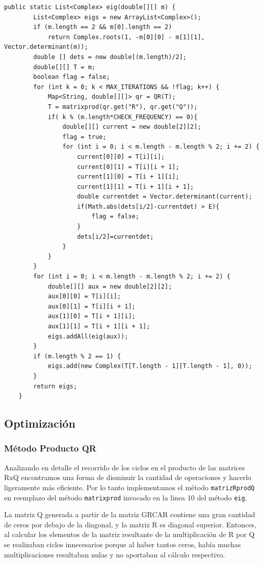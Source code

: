\documentclass[a4paper,10pt,spanish]{article}
\begin{document}
\begin{lstlisting}[caption = Implementación del algoritmo QR en Java]
public static List<Complex> eig(double[][] m) {
		List<Complex> eigs = new ArrayList<Complex>();
		if (m.length == 2 && m[0].length == 2)
			return Complex.roots(1, -m[0][0] - m[1][1], Vector.determinant(m));
		double [] dets = new double[(m.length)/2];
		double[][] T = m;
		boolean flag = false;
		for (int k = 0; k < MAX_ITERATIONS && !flag; k++) {
			Map<String, double[][]> qr = QR(T);
			T = matrixprod(qr.get("R"), qr.get("Q"));
			if( k % (m.length*CHECK_FREQUENCY) == 0){
				double[][] current = new double[2][2];
				flag = true;
				for (int i = 0; i < m.length - m.length % 2; i += 2) {
					current[0][0] = T[i][i];
					current[0][1] = T[i][i + 1];
					current[1][0] = T[i + 1][i];
					current[1][1] = T[i + 1][i + 1];
					double currentdet = Vector.determinant(current);
					if(Math.abs(dets[i/2]-currentdet) > E){
						flag = false;
					}
					dets[i/2]=currentdet;
				}
			}
		}
		for (int i = 0; i < m.length - m.length % 2; i += 2) {
			double[][] aux = new double[2][2];
			aux[0][0] = T[i][i];
			aux[0][1] = T[i][i + 1];
			aux[1][0] = T[i + 1][i];
			aux[1][1] = T[i + 1][i + 1];
			eigs.addAll(eig(aux));
		}
		if (m.length % 2 == 1) {
			eigs.add(new Complex(T[T.length - 1][T.length - 1], 0));
		}
		return eigs;
	}
\end{lstlisting}

\subsection{Optimización}

\subsubsection{Método Producto QR}

Analizando en detalle el recorrido de los ciclos en el producto de las matrices RxQ encontramos una forma de disminuir la cantidad de operaciones y hacerlo ligeramente más eficiente. Por lo tanto implementamos el método  \texttt{matrizRprodQ} en reemplazo del método  \texttt{matrixprod} invocado en la linea 10 del método \texttt{eig}.

La matriz Q generada a partir de la matriz GRCAR contiene una gran cantidad de ceros por debajo de la diagonal, y la  matriz R es diagonal superior. Entonces, al calcular los elementos de la matriz resultante de la multiplicación de R por Q se realizaban ciclos innecesarios porque al haber tantos ceros, había muchas multiplicaciones resultaban nulas y no aportaban al cálculo respectivo.
\end{document}
